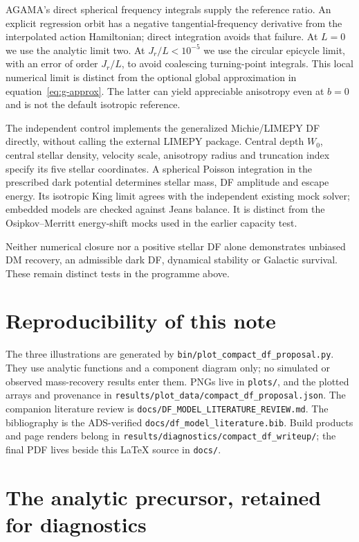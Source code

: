 \documentclass[11pt,a4paper]{article}
\begin{document}
AGAMA's direct spherical frequency integrals supply the reference ratio.
An explicit regression orbit has a negative tangential-frequency derivative
from the interpolated action Hamiltonian; direct integration avoids that
failure. At $L=0$ we use the analytic limit two. At $J_r/L<10^{-5}$ we use
the circular epicycle limit, with an error of order $J_r/L$, to avoid
coalescing turning-point integrals. This local numerical limit is distinct
from the optional global approximation in equation~\eqref{eq:g-approx}.
The latter can yield appreciable anisotropy even at $b=0$ and is not the
default isotropic reference.

The independent control implements the generalized Michie/LIMEPY DF directly,
without calling the external LIMEPY package. Central depth $W_0$, central
stellar density, velocity scale, anisotropy radius and truncation index
specify its five stellar coordinates. A spherical Poisson integration in the
prescribed dark potential determines stellar mass, DF amplitude and escape
energy. Its isotropic King limit agrees with the independent existing mock
solver; embedded models are checked against Jeans balance. It is distinct
from the Osipkov--Merritt energy-shift mocks used in the earlier capacity test.

Neither numerical closure nor a positive stellar DF alone demonstrates
unbiased DM recovery, an admissible dark DF, dynamical stability or Galactic
survival. These remain distinct tests in the programme above.

\clearpage
\appendix
\section{Reproducibility of this note}

The three illustrations are generated by
\nolinkurl{bin/plot_compact_df_proposal.py}. They use analytic functions and a
component diagram only; no simulated or observed mass-recovery results enter
them. PNGs live in \texttt{plots/}, and the plotted arrays and provenance in
\nolinkurl{results/plot_data/compact_df_proposal.json}.
The companion literature review is \nolinkurl{docs/DF_MODEL_LITERATURE_REVIEW.md}.
The bibliography is the ADS-verified \nolinkurl{docs/df_model_literature.bib}.
Build products and page renders belong in
\nolinkurl{results/diagnostics/compact_df_writeup/}; the final PDF lives beside
this LaTeX source in \texttt{docs/}.

\section{The analytic precursor, retained for diagnostics}
\label{app:precursor}
\end{document}
